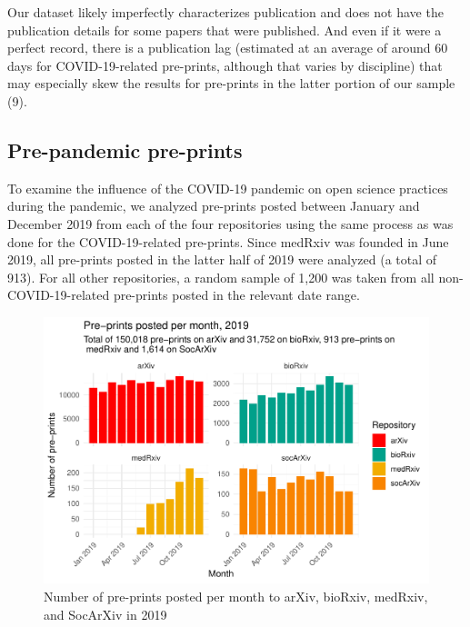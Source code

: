 \documentclass[
]{article}
\begin{document}
Our dataset likely imperfectly characterizes publication and does not have the publication details for some papers that were published. And even if it were a perfect record, there is a publication lag (estimated at an average of around 60 days for COVID-19-related pre-prints, although that varies by discipline) that may especially skew the results for pre-prints in the latter portion of our sample (9).

\hypertarget{pre-pandemic-pre-prints}{%
\subsection{Pre-pandemic pre-prints}\label{pre-pandemic-pre-prints}}

To examine the influence of the COVID-19 pandemic on open science practices during the pandemic, we analyzed pre-prints posted between January and December 2019 from each of the four repositories using the same process as was done for the COVID-19-related pre-prints. Since medRxiv was founded in June 2019, all pre-prints posted in the latter half of 2019 were analyzed (a total of 913). For all other repositories, a random sample of 1,200 was taken from all non-COVID-19-related pre-prints posted in the relevant date range.

\begin{figure}

{\centering \includegraphics[width=0.9\linewidth]{paper_files/figure-latex/2019-results-med-arxiv-1} 

}

\caption{Number of pre-prints posted per month to arXiv, bioRxiv, medRxiv, and SocArXiv in 2019}\label{fig:2019-results-med-arxiv}
\end{figure}
\end{document}
